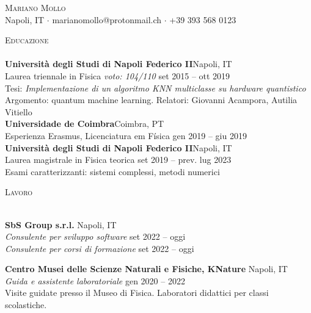 \documentclass[a4paper]{article}
\newcommand{\lineunder} {
  \vspace*{-8pt} \\
  \hspace*{-18pt} \hrulefill \\
}
\newcommand{\header} [1] {
  {\hspace*{-18pt}\vspace*{6pt} \textsc{#1}}
  \vspace*{-6pt} \lineunder
}
\begin{document}
\vspace*{-40pt}

    

\vspace*{-10pt}
\begin{center}
  {\Huge \scshape {Mariano Mollo}}\\
  Napoli, IT $\cdot$ marianomollo@protonmail.ch $\cdot$ +39 393 568 0123\\
\end{center}

\header{Educazione}
\textbf{Università degli Studi di Napoli Federico II}\hfill Napoli, IT\\
Laurea triennale in Fisica \textit{voto: 104/110} \hfill set 2015 -- ott 2019\\
Tesi: \textit{Implementazione di un algoritmo KNN multiclasse su hardware quantistico}\\
Argomento: quantum machine learning.
Relatori: Giovanni Acampora, Autilia Vitiello\\
\vspace{2mm}
\textbf{Universidade de Coimbra}\hfill Coimbra, PT\\
Esperienza Erasmus, Licenciatura em Física \hfill gen 2019 -- giu 2019\\
\vspace{2mm}
\textbf{Università degli Studi di Napoli Federico II}\hfill Napoli, IT\\
Laurea magistrale in Fisica teorica \hfill set 2019 -- prev. lug 2023\\
Esami caratterizzanti: sistemi complessi, metodi numerici
\vspace{2mm}

\header{Lavoro}
\vspace{1mm}

\textbf{SbS Group s.r.l.} \hfill Napoli, IT \\
\textit{Consulente per sviluppo software} \hfill set 2022 -- oggi \\
\textit{Consulente per corsi di formazione} \hfill set 2022 -- oggi \\
\vspace{5mm}

\textbf{Centro Musei delle Scienze Naturali e Fisiche, KNature} \hfill Napoli, IT\\
\textit{Guida e assistente laboratoriale} \hfill gen 2020 -- 2022\\
\vspace{-1mm}
Visite guidate presso il Museo di Fisica.
Laboratori didattici per classi scolastiche.
\vspace{5mm}
\end{document}
